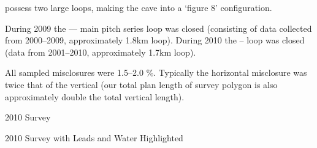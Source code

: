  possess two large loops, making the cave into a `figure 8' configuration. 

During 2009 the  --- main pitch series loop was closed
(consisting of data collected from 2000--2009, approximately 1.8km loop).
During 2010 the  --  loop was closed (data from
2001--2010, approximately 1.7km loop).

All sampled misclosures were 1.5--2.0 \%. Typically the horizontal misclosure
was twice that of the vertical (our total plan length of survey polygon is also
approximately double the total vertical length).




\begin{pagesurvey}
\centering
{}
\caption[2010 Vrtnarija Survey]{2010  Survey}
\end{pagesurvey}


\begin{pagesurvey}
\centering
{}
\caption[2010 Vrtnarija Survey with Leads and Water Highlighted]{2010  Survey  with Leads and Water Highlighted}
\end{pagesurvey}